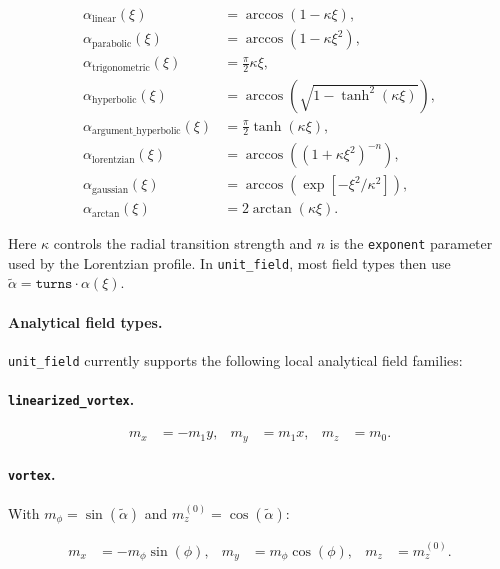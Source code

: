 \documentclass[11pt,a4paper]{article}
\begin{document}
\begin{align*}
    \alpha_{\mathrm{linear}}(\xi)
        &= \arccos(1 - \kappa \xi), \\
    \alpha_{\mathrm{parabolic}}(\xi)
        &= \arccos(1 - \kappa \xi^2), \\
    \alpha_{\mathrm{trigonometric}}(\xi)
        &= \frac{\pi}{2}\kappa \xi, \\
    \alpha_{\mathrm{hyperbolic}}(\xi)
        &= \arccos\left(\sqrt{1 - \tanh^2(\kappa \xi)}\right), \\
    \alpha_{\mathrm{argument\_hyperbolic}}(\xi)
        &= \frac{\pi}{2}\tanh(\kappa \xi), \\
    \alpha_{\mathrm{lorentzian}}(\xi)
        &= \arccos\left((1 + \kappa \xi^2)^{-n}\right), \\
    \alpha_{\mathrm{gaussian}}(\xi)
        &= \arccos\left(\exp\left[-\xi^2/\kappa^2\right]\right), \\
    \alpha_{\mathrm{arctan}}(\xi)
        &= 2\arctan(\kappa \xi).
\end{align*}

Here \(\kappa\) controls the radial transition strength and \(n\) is the
\texttt{exponent} parameter used by the Lorentzian profile. In
\texttt{unit\_field}, most field types then use
\(\tilde{\alpha} = \texttt{turns}\cdot\alpha(\xi)\).

\paragraph{Analytical field types.}

\texttt{unit\_field} currently supports the following local analytical field
families:

\paragraph{\texttt{linearized\_vortex}.}

\begin{align*}
    m_x &= -m_1 y, &
    m_y &= m_1 x, &
    m_z &= m_0 .
\end{align*}

\paragraph{\texttt{vortex}.}

With \(m_\phi = \sin(\tilde{\alpha})\) and
\(m_z^{(0)} = \cos(\tilde{\alpha})\):

\begin{align*}
    m_x &= -m_\phi \sin(\phi), &
    m_y &=  m_\phi \cos(\phi), &
    m_z &=  m_z^{(0)} .
\end{align*}
\end{document}
